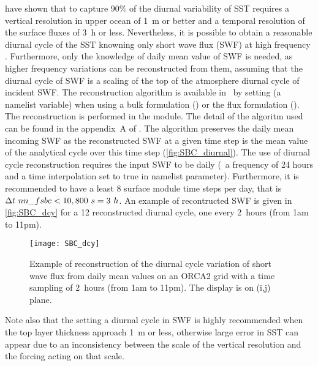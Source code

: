 \documentclass[../main/NEMO_manual]{subfiles}
\begin{document}
\cite{bernie.woolnough.ea_JC05} have shown that to capture 90$\%$ of the diurnal variability of SST requires a vertical resolution in upper ocean of 1~m or better and a temporal resolution of the surface fluxes of 3~h or less.
Nevertheless, it is possible to obtain a reasonable diurnal cycle of the SST knowning only short wave flux (SWF) at high frequency \citep{bernie.guilyardi.ea_CD07}.
Furthermore, only the knowledge of daily mean value of SWF is needed,
as higher frequency variations can be reconstructed from them,
assuming that the diurnal cycle of SWF is a scaling of the top of the atmosphere diurnal cycle of incident SWF.
The \cite{bernie.guilyardi.ea_CD07} reconstruction algorithm is available in \NEMO\ by
setting  (a \textit{} namelist variable) when
using a bulk formulation () or
the flux formulation ().
The reconstruction is performed in the  module.
The detail of the algoritm used can be found in the appendix~A of \cite{bernie.guilyardi.ea_CD07}.
The algorithm preserves the daily mean incoming SWF as the reconstructed SWF at
a given time step is the mean value of the analytical cycle over this time step (\autoref{fig:SBC_diurnal}).
The use of diurnal cycle reconstruction requires the input SWF to be daily
(\ie\ a frequency of 24 hours and a time interpolation set to true in  namelist parameter).
Furthermore, it is recommended to have a least 8 surface module time steps per day,
that is  $\rdt \ nn\_fsbc < 10,800~s = 3~h$.
An example of recontructed SWF is given in \autoref{fig:SBC_dcy} for a 12 reconstructed diurnal cycle,
one every 2~hours (from 1am to 11pm).

\begin{figure}[!t]
  \centering
  \texttt{[image: SBC\_dcy]}
  \caption[Reconstruction of the diurnal cycle variation of short wave flux on an ORCA2 grid]{
    Example of reconstruction of the diurnal cycle variation of short wave flux from
    daily mean values on an ORCA2 grid with a time sampling of 2~hours (from 1am to 11pm).
    The display is on (i,j) plane.}
  \label{fig:SBC_dcy}
\end{figure}

Note also that the setting a diurnal cycle in SWF is highly recommended when
the top layer thickness approach 1~m or less, otherwise large error in SST can appear due to
an inconsistency between the scale of the vertical resolution and the forcing acting on that scale.
\end{document}
